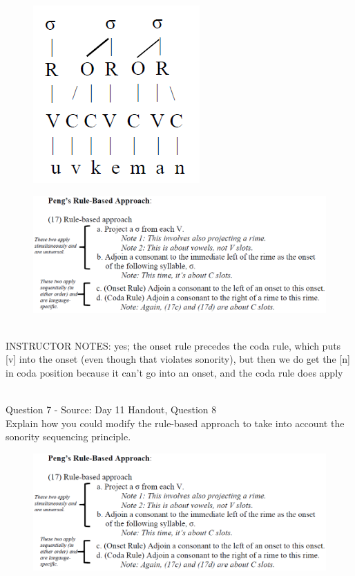 \documentclass[12pt]{article}
\begin{document}
\begin{figure}[H]
\includegraphics{../images/pengrules_uvkeman_yes.png}
\end{figure}
\begin{figure}[H]
\includegraphics{../images/peng_rules.png}
\end{figure}

~\\
INSTRUCTOR NOTES: yes; the onset rule precedes the coda rule, which puts [v] into the onset (even though that violates sonority), but then we do get the [n] in coda position because it can't go into an onset, and the coda rule does apply


~\\

{\large Question 7} - Source: Day 11 Handout, Question 8\\

Explain how you could modify the rule-based approach to take into account the sonority sequencing principle.\\

\begin{figure}[H]
\includegraphics{../images/peng_rules.png}
\end{figure}
\end{document}
